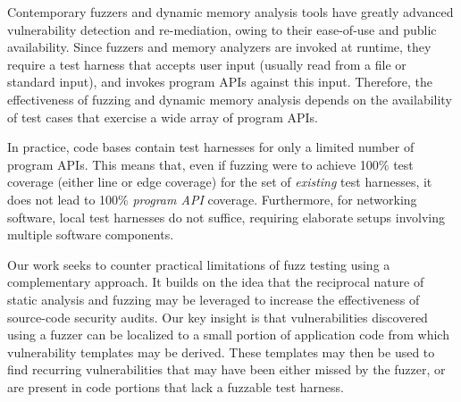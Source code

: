 Contemporary fuzzers and dynamic memory analysis tools have greatly advanced vulnerability detection and re-mediation, owing to their ease-of-use and public availability.
Since fuzzers and memory analyzers are invoked at runtime, they require a test harness that accepts user input (usually read from a file or standard input), and invokes program APIs against this input.
Therefore, the effectiveness of fuzzing and dynamic memory analysis depends on the availability of test cases that exercise a wide array of program APIs.

In practice, code bases contain test harnesses for only a limited number of program APIs.
This means that, even if fuzzing were to achieve 100\% test coverage (either line or edge coverage) for the set of {\it existing} test harnesses, it does not lead to 100\% {\it program API} coverage.
Furthermore, for networking software, local test harnesses do not suffice, requiring elaborate setups involving multiple software components.

Our work seeks to counter practical limitations of fuzz testing using a complementary approach.
It builds on the idea that the reciprocal nature of static analysis and fuzzing may be leveraged to increase the effectiveness of source-code security audits.
Our key insight is that vulnerabilities discovered using a fuzzer can be localized to a small portion of application code from which vulnerability templates may be derived.
These templates may then be used to find recurring vulnerabilities that may have been either missed by the fuzzer, or are present in code portions that lack a fuzzable test harness.

